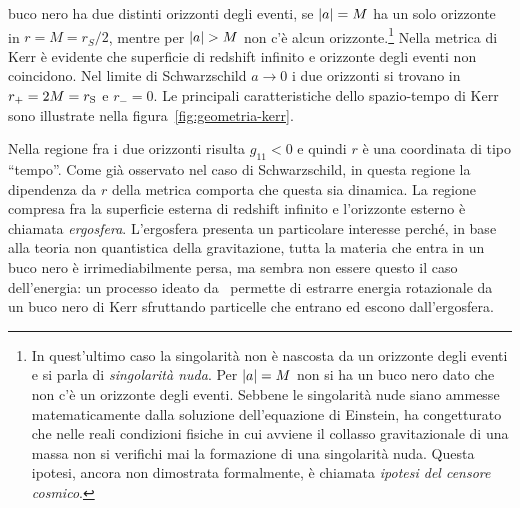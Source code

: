 buco nero ha due distinti orizzonti degli eventi, se \(\lvert a\rvert = M\) ha un solo
orizzonte in \(r = M = r_{S}/2\), mentre per \(\lvert a\rvert > M\) non c'è alcun
orizzonte.\footnote{In quest'ultimo caso la singolarità non è nascosta da un
  orizzonte degli eventi e si parla di \emph{singolarità nuda}.  Per \(\lvert a\rvert =
  M\) non si ha un buco nero dato che non c'è un orizzonte degli eventi.
  Sebbene le singolarità nude siano ammesse matematicamente dalla soluzione
  dell'equazione di Einstein, \textcite{1969NCimR...1..252P} ha congetturato che
  nelle reali condizioni fisiche in cui avviene il collasso gravitazionale di
  una massa non si verifichi mai la formazione di una singolarità nuda.  Questa
  ipotesi, ancora non dimostrata formalmente, è chiamata \emph{ipotesi del
    censore cosmico}.}  Nella metrica di Kerr è evidente che superficie di
redshift infinito e orizzonte degli eventi non coincidono.  Nel limite di
Schwarzschild \(a\to 0\) i due orizzonti si trovano in \(r_{+} = 2M =
r_{\textup{S}}\) e \(r_{-} = 0\).  Le principali caratteristiche dello
spazio-tempo di Kerr sono illustrate nella figura~\ref{fig:geometria-kerr}.

Nella regione fra i due orizzonti risulta \(g_{11} < 0\) e quindi \(r\) è una
coordinata di tipo ``tempo''.  Come già osservato nel caso di Schwarzschild, in
questa regione la dipendenza da \(r\) della metrica comporta che questa sia
dinamica.  La regione compresa fra la superficie esterna di redshift infinito e
l'orizzonte esterno è chiamata \emph{ergosfera}.  L'ergosfera presenta un
particolare interesse perché, in base alla teoria non quantistica della
gravitazione, tutta la materia che entra in un buco nero è irrimediabilmente
persa, ma sembra non essere questo il caso dell'energia: un processo ideato
da~\textcite{1969NCimR...1..252P} permette di estrarre energia rotazionale da un
buco nero di Kerr sfruttando particelle che entrano ed escono dall'ergosfera.

